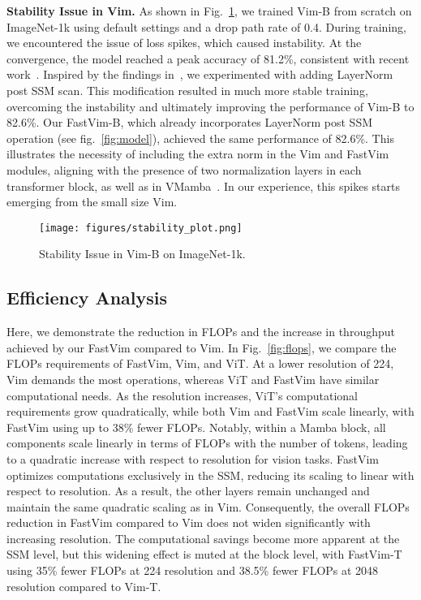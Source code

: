 \noindent \textbf{Stability Issue in Vim.} As shown in Fig.~\ref{fig:stability}, we trained Vim-B from scratch on ImageNet-1k using default settings and a drop path rate of 0.4. During training, we encountered the issue of loss spikes, which caused instability. At the convergence, the model reached a peak accuracy of 81.2\%, consistent with recent work~\cite{ren2024autoregressive}. Inspired by the findings in~\cite{vmamba, jamba}, we experimented with adding LayerNorm post SSM scan. This modification resulted in much more stable training, overcoming the instability and ultimately improving the performance of Vim-B to 82.6\%. Our FastVim-B, which already incorporates LayerNorm post SSM operation (see fig.~\ref{fig:model}), achieved the same performance of 82.6\%. This illustrates the necessity of including the extra norm in the Vim and FastVim modules, aligning with the presence of two normalization layers in each transformer block, as well as in VMamba~\cite{vmamba}. In our experience, this spikes starts emerging from the small size Vim.


\begin{figure}[t]
\centering
    \texttt{[image: figures/stability\_plot.png]}
    \caption{Stability Issue in Vim-B on ImageNet-1k.
    }
     \vspace{-10pt}
    \label{fig:stability}
\end{figure}


\subsection{Efficiency Analysis}
\label{subexp:throughput}

Here, we demonstrate the reduction in FLOPs and the increase in throughput achieved by our FastVim compared to Vim. In Fig.~\ref{fig:flops}, we compare the FLOPs requirements of FastVim, Vim, and ViT. At a lower resolution of 224, Vim demands the most operations, whereas ViT and FastVim have similar computational needs. As the resolution increases, ViT's computational requirements grow quadratically, while both Vim and FastVim scale linearly, with FastVim using up to 38\% fewer FLOPs. Notably, within a Mamba block, all components scale linearly in terms of FLOPs with the number of tokens, leading to a quadratic increase with respect to resolution for vision tasks. FastVim optimizes computations exclusively in the SSM, reducing its scaling to linear with respect to resolution. As a result, the other layers remain unchanged and maintain the same quadratic scaling as in Vim. Consequently, the overall FLOPs reduction in FastVim compared to Vim does not widen significantly with increasing resolution. The computational savings become more apparent at the SSM level, but this widening effect is muted at the block level, with FastVim-T using 35\% fewer FLOPs at 224 resolution and 38.5\% fewer FLOPs at 2048 resolution compared to Vim-T.


